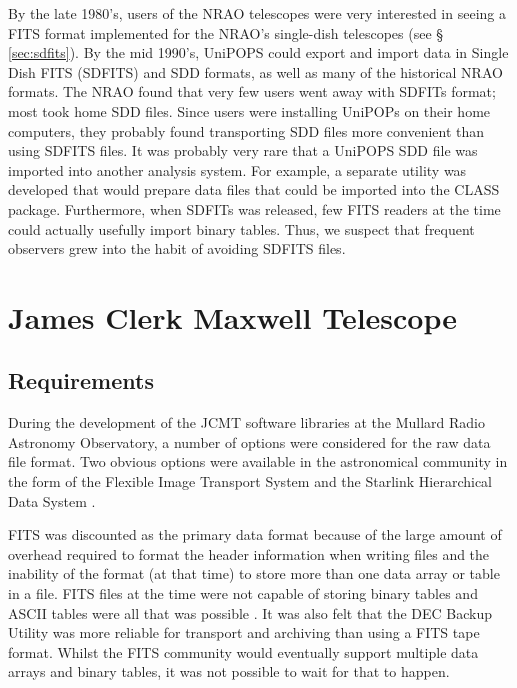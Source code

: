 \documentclass[final,authoryear,5p,times,twocolumn]{elsarticle}
\newcommand{\ascl}[1]{\href{http://www.ascl.net/#1}{ascl:#1}}
\begin{document}
By the late 1980's, users of the NRAO telescopes were very interested
in seeing a FITS format implemented for the NRAO's single-dish
telescopes (see \S\,\ref{sec:sdfits}). By the mid 1990's,
UniPOPS could export and import data in Single Dish FITS (SDFITS) and
SDD formats, as well as many
of the historical NRAO formats.  The NRAO found that very few users
went away with SDFITs format; most took home SDD files.  Since
users were installing UniPOPs on their home computers, they probably
found transporting SDD files more convenient than using
SDFITS files.  It was probably very rare that a UniPOPS SDD file was
imported into another analysis system.  For example, a separate
utility was developed that would prepare data files that could be
imported into the {\textsc CLASS} package.
Furthermore, when SDFITs was released, few FITS readers at the
time could actually usefully import binary tables.  Thus, we suspect
that frequent observers grew into the habit of avoiding SDFITS files.

\section{James Clerk Maxwell Telescope}

\subsection{Requirements}

During the development of the JCMT software libraries at the Mullard
Radio Astronomy Observatory, a number of options were considered for
the raw data file format.  Two obvious options were available in the
astronomical community in the form of the Flexible Image Transport System
\citep[FITS;][]{1981A&AS...44..363W} and the Starlink Hierarchical
Data System \citep[HDS;][\ascl{1502.009}]{1982QJRAS..23..485D,2015HDS}.

FITS was discounted as the primary data format because of the large
amount of overhead required to format the header information when
writing files and the inability of the format (at that time) to store
more than one
data array or table in a file. FITS files at the time were not capable
of storing binary tables and ASCII tables were all that was possible
\citep{1988A&AS...73..365H}. It was also felt that the DEC Backup
Utility was more reliable for transport and archiving than using a
FITS tape format. Whilst the FITS community would
eventually support multiple data arrays and binary tables, it was not
possible to wait for that to happen.
\end{document}
